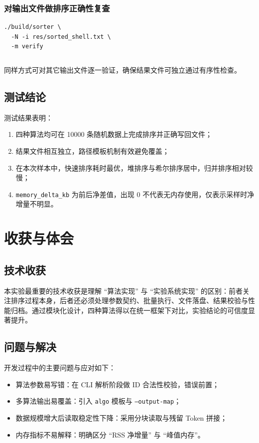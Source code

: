 \documentclass[12pt, a4paper]{ctexart}
\begin{document}
\subsubsection{对输出文件做排序正确性复查}

\begin{verbatim}
./build/sorter \
  -N -i res/sorted_shell.txt \
  -m verify
\end{verbatim}

\inputminted{text}{../res/verify.txt}

同样方式可对其它输出文件逐一验证，确保结果文件可独立通过有序性检查。

\subsection{测试结论}

测试结果表明：

\begin{enumerate}
    \item 四种算法均可在 10000 条随机数据上完成排序并正确写回文件；
    \item 结果文件相互独立，路径模板机制有效避免覆盖；
    \item 在本次样本中，快速排序耗时最优，堆排序与希尔排序居中，归并排序相对较慢；
    \item \texttt{memory_delta_kb} 为前后净差值，出现 0 不代表无内存使用，仅表示采样时净增量不明显。
\end{enumerate}

\section{收获与体会}

\subsection{技术收获}

本实验最重要的技术收获是理解 ``算法实现'' 与 ``实验系统实现'' 的区别：前者关注排序过程本身，后者还必须处理参数契约、批量执行、文件落盘、结果校验与性能归档。通过模块化设计，四种算法得以在统一框架下对比，实验结论的可信度显著提升。

\subsection{问题与解决}

开发过程中的主要问题与应对如下：

\begin{itemize}
    \item 算法参数易写错：在 CLI 解析阶段做 ID 合法性校验，错误前置；
    \item 多算法输出易覆盖：引入 \texttt{{algo}} 模板与 \texttt{--output-map}；
    \item 数据规模增大后读取稳定性下降：采用分块读取与残留 Token 拼接；
    \item 内存指标不易解释：明确区分 ``RSS 净增量'' 与 ``峰值内存''。
\end{itemize}
\end{document}
